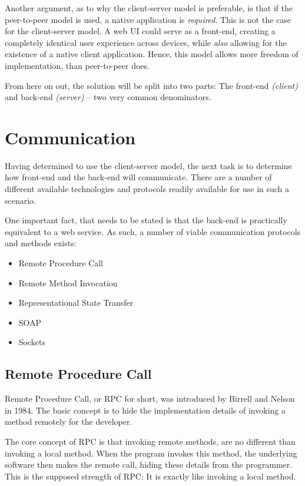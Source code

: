 			Another argument, as to why the client-server model is preferable, is that if the peer-to-peer model is used, a native application is \emph{required}. This is not the case for the client-server model. A web UI could serve as a front-end, creating a completely identical user experience across devices, while \emph{also} allowing for the existence of a native client application. Hence, this model allows more freedom of implementation, than peer-to-peer does.

			From here on out, the solution will be split into two parts: The front-end \emph{(client)} and back-end \emph{(server)} -- two very common denominators.

	\section{Communication}
		\label{sec:comms}
		Having determined to use the client-server model, the next task is to determine how front-end and the back-end will communicate. There are a number of different available technologies and protocols readily available for use in such a scenario.

		One important fact, that needs to be stated is that the back-end is practically equivalent to a web service. As such, a number of viable communication protocols and methods exists:

		\begin{itemize}
			\item Remote Procedure Call
			\item Remote Method Invocation
			\item Representational State Transfer
			\item SOAP	
			\item Sockets
		\end{itemize}

		\subsection{Remote Procedure Call}
			Remote Procedure Call, or RPC for short, was introduced by Birrell and Nelson \cite{birell1984} in 1984. The basic concept is to hide the implementation details of invoking a method remotely for the developer.

			The core concept of RPC is that invoking remote methods, are no different than invoking a local method. When the program invokes this method, the underlying software then makes the remote call, hiding these details from the programmer. This is the supposed strength of RPC: It is exactly like invoking a local method.

